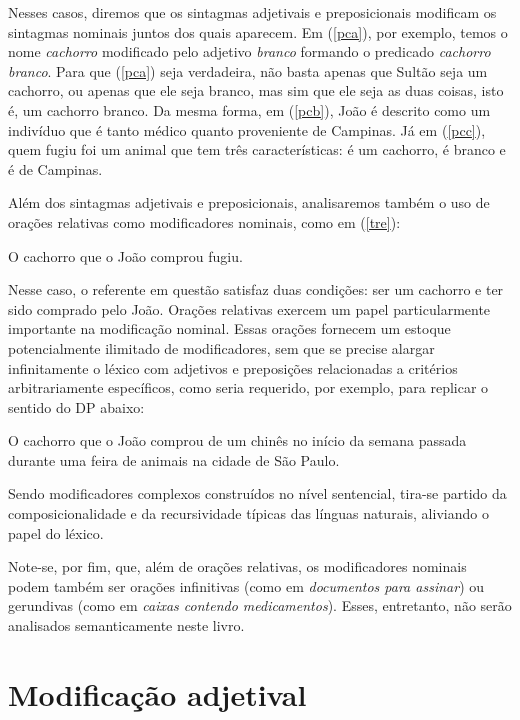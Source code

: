 \n Nesses casos, diremos que os sintagmas adjetivais e
preposicionais modificam os sintagmas nominais juntos dos quais
aparecem. Em (\ref{pca}), por exemplo, temos o nome \textit{cachorro}
modificado pelo adjetivo \textit{branco} formando o predicado \textit{cachorro branco}. Para que (\ref{pca}) seja verdadeira, não basta apenas que
Sultão seja um cachorro, ou apenas que ele seja branco, mas
sim que ele seja as duas coisas, isto é, um cachorro branco. Da
mesma forma, em (\ref{pcb}), João é descrito como um indivíduo que
é tanto médico quanto proveniente de Campinas. Já em (\ref{pcc}),
quem fugiu foi um animal que tem três características: é um
cachorro, é branco e é de Campinas.

Além dos sintagmas adjetivais e preposicionais, analisaremos
também o uso de orações relativas como modificadores nominais,
como em (\ref{tre}):

\begin{exe}
\ex O cachorro que o João comprou fugiu.\label{tre}
\end{exe}

Nesse caso, o referente em questão satisfaz duas condições: ser um cachorro e ter sido comprado pelo João. Orações relativas exercem um papel particularmente importante na modificação nominal. Essas orações fornecem um estoque potencialmente ilimitado de modificadores, sem que se precise alargar infinitamente o léxico com adjetivos e preposições relacionadas a critérios arbitrariamente específicos, como seria requerido, por exemplo, para replicar o sentido do DP abaixo:

\begin{exe}
	\ex O cachorro que o João comprou de um chinês no início da semana passada durante uma feira de animais na cidade de São Paulo.\label{ret}
\end{exe}

\n Sendo modificadores complexos construídos no nível sentencial, tira-se partido da composicionalidade e da recursividade típicas das línguas naturais, aliviando o papel do léxico. 

Note-se, por fim, que, além de orações relativas, os modificadores nominais podem também ser orações infinitivas (como em \textit{documentos para assinar}) ou gerundivas (como em \textit{caixas contendo medicamentos}). Esses, entretanto, não serão analisados semanticamente neste livro.



\section{Modificação adjetival}

